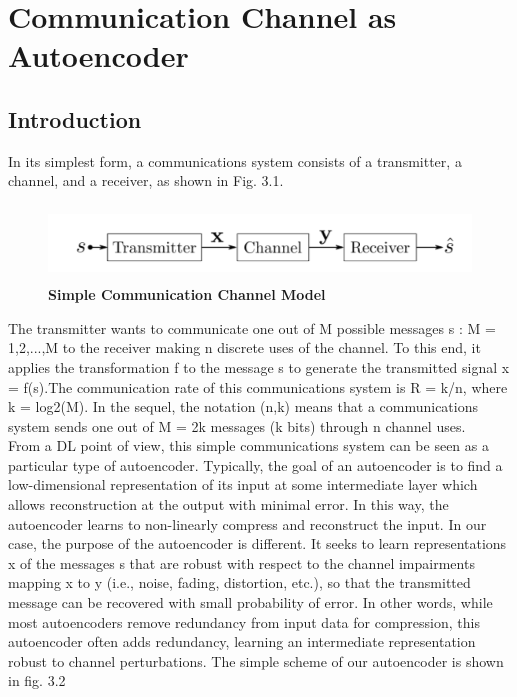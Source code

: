 \chapter{Communication Channel as Autoencoder}

\section{Introduction}
In its simplest form, a communications system consists of a transmitter, a channel, and a receiver, as shown in Fig. 3.1.
\begin{figure}[H]
  \centering
    \includegraphics[height= 2cm, width=18cm]{project/images/channel.png}
  \caption{\textbf{Simple Communication Channel Model}}
\end{figure}
The transmitter wants to communicate one out of M possible messages s : M = {1,2,...,M} to the receiver making n discrete uses of the channel. To this end, it applies the transformation f to the message s to generate the transmitted signal x = f(s).The communication rate of this communications system is R = k/n, where k = log2(M). In the sequel, the notation (n,k) means that a communications system sends one out of M = 2k messages (k bits) through n channel uses.\\
From a DL point of view, this simple communications system can be seen as a particular type of autoencoder. Typically, the goal of an autoencoder is to find a low-dimensional representation of its input at some intermediate layer which allows reconstruction at the output with minimal error. In this way, the autoencoder learns to non-linearly compress and reconstruct the input. In our case, the purpose of the autoencoder is different. It seeks to learn representations x of the messages s that are robust with respect to the channel impairments mapping x to y (i.e., noise, fading, distortion, etc.), so that the transmitted message can be recovered with small probability of error. In other words, while most autoencoders remove redundancy from input data for compression, this autoencoder often adds redundancy, learning an intermediate representation robust to channel perturbations. The simple scheme of our autoencoder is shown in fig. 3.2
\vspace{3cm}
